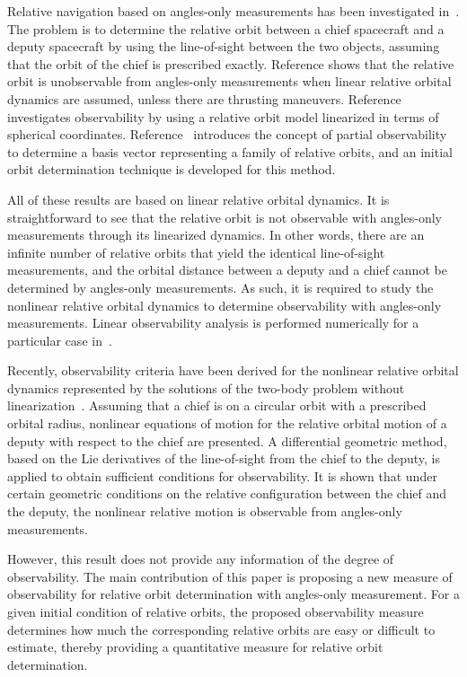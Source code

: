\documentclass[letterpaper, preprint, paper,11pt]{AAS}	%
\begin{document}
Relative navigation based on angles-only measurements has been investigated in~\cite{WofGelITAES09,Tom11,PatLovPASFMM12}.  The problem is to determine the relative orbit between a chief spacecraft and a deputy spacecraft by using the line-of-sight between the two objects, assuming that the orbit of the chief is prescribed exactly.  Reference \cite{WofGelITAES09} shows that the relative orbit is unobservable from angles-only measurements when linear relative orbital dynamics are assumed, unless there are thrusting maneuvers. Reference \cite{Tom11} investigates observability by using a relative orbit model linearized in terms of spherical coordinates.  Reference~\cite{PatLovPASFMM12} introduces the concept of partial observability to determine a basis vector representing a family of relative orbits, and an initial orbit determination technique is developed for this method.

All of these results are based on linear relative orbital dynamics. It is straightforward to see that the relative orbit is not observable with angles-only measurements through its linearized dynamics. In other words, there are an infinite number of relative orbits that yield the identical line-of-sight measurements, and the orbital distance between a deputy and a chief cannot be determined by angles-only measurements. As such, it is required to study the nonlinear relative orbital dynamics to determine observability with angles-only measurements. Linear observability analysis is performed numerically for a particular case in~\cite{YimCraPASMM04}. 

Recently, observability criteria have been derived for the nonlinear relative orbital dynamics represented by the solutions of the two-body problem without linearization~\cite{LovLeePISSFD14}.  Assuming that a chief is on a circular orbit with a prescribed orbital radius, nonlinear equations of motion for the relative orbital motion of a deputy with respect to the chief are presented.  A differential geometric method, based on the Lie derivatives of the line-of-sight from the chief to the deputy, is applied to obtain sufficient conditions for observability.  It is shown that under certain geometric conditions on the relative configuration between the chief and the deputy, the nonlinear relative motion is observable from angles-only measurements.  

However, this result does not provide any information of the degree of observability. The main contribution of this paper is proposing a new  measure of observability for relative orbit determination with angles-only measurement. For a given initial condition of relative orbits, the proposed observability measure determines how much the corresponding relative orbits are easy or difficult to estimate, thereby providing a quantitative measure for relative orbit determination.
\end{document}
